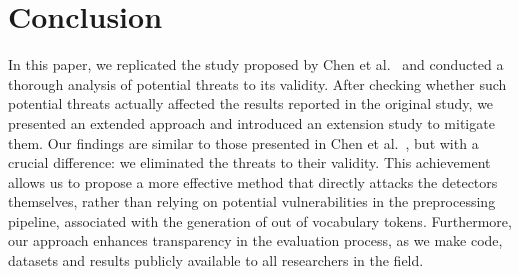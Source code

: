 \section{Conclusion}
\label{sec:conclusion}

In this paper, we replicated the study proposed by Chen et al.~\cite{CHEN2022102831} and conducted a thorough analysis of potential threats to its validity. After checking whether such potential threats actually affected the results reported in the original study, we presented an extended approach and introduced an extension study to mitigate them. Our findings are similar to those presented in Chen et al.~\cite{CHEN2022102831}, but with a crucial difference: we eliminated the threats to their validity. This achievement allows us to propose a more effective method that directly attacks the detectors themselves, rather than relying on potential vulnerabilities in the preprocessing pipeline, associated with the generation of out of vocabulary tokens. Furthermore, our approach enhances transparency in the evaluation process, as we make code, datasets and results publicly available to all researchers in the field.
